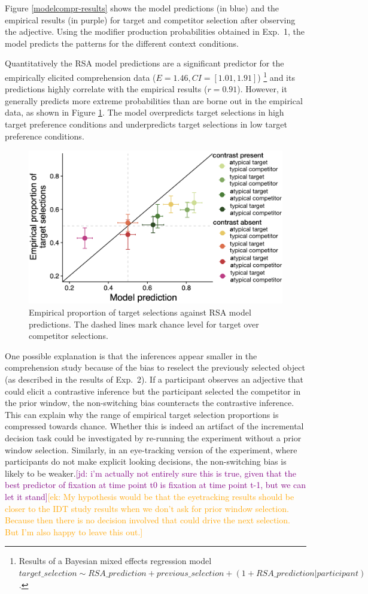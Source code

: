 \documentclass[10pt,letterpaper]{article}
\newcommand{\ek}[1]{\textcolor{Orange}{[ek: #1]}}
\newcommand{\jd}[1]{\textcolor{Purple}{[jd: #1]}}
\newcommand{\figref}[1]{Figure \ref{#1}}
\begin{document}
\figref{modelcompr-results} shows the model predictions (in blue) and the empirical results (in purple) for target and competitor selection after observing the adjective. Using the modifier production probabilities obtained in Exp.~1, the model predicts the patterns for the different context conditions. 

Quantitatively the RSA model predictions are a significant predictor for the empirically elicited comprehension data ($E=1.46, CI=[1.01, 1.91]$)
\footnote{Results of a Bayesian mixed effects regression model $target\_selection \sim RSA\_prediction + previous\_selection + (1+RSA\_prediction|participant)$.} 
and its predictions highly correlate with the empirical results ($r=0.91$). However, it generally predicts more extreme probabilities than are borne out in the empirical data, as shown in \figref{model-results-corr-flatprior}. The model overpredicts target selections in high target preference conditions and underpredicts target selections in low target preference conditions. 

\begin{figure}
	\begin{center}
		\includegraphics[width=.475\textwidth]{graphs/corr-plot.pdf}
	\end{center}
\caption{Empirical proportion of target selections against RSA model predictions. The dashed lines mark chance level for target over competitor selections.} 
\label{model-results-corr-flatprior}
\end{figure}

One possible explanation is that the inferences appear smaller in the comprehension study because of the bias to reselect the previously selected object (as described in the results of Exp.~2). If a participant observes an adjective that could elicit a contrastive inference but the participant selected the competitor in the prior window, the non-switching bias counteracts the contrastive inference. This can explain why the range of empirical target selection proportions is compressed towards chance. Whether this is indeed an artifact of the incremental decision task could be investigated by re-running the experiment without a prior window selection. Similarly, in an eye-tracking version of the experiment, where participants do not make explicit looking decisions, the non-switching bias is likely to be weaker.\jd{i'm actually not entirely sure this is true, given that the best predictor of fixation at time point t0 is fixation at time point t-1, but we can let it stand}\ek{My hypothesis would be that the eyetracking results should be closer to the IDT study results when we don't ask for prior window selection. Because then there is no decision involved that could drive the next selection. But I'm also happy to leave this out.}
\end{document}
